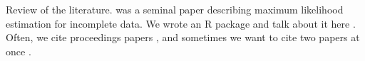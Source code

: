 Review of the literature. \citet{emalgorithm} was a seminal paper describing maximum likelihood
estimation for incomplete data. We wrote an R package and talk about it here \citep{TDARpackage}.
Often, we cite proceedings papers \citep{plh-survey}, and sometimes we want to cite
two papers at once \citep{chen2018statistical,wasserman2004}.
